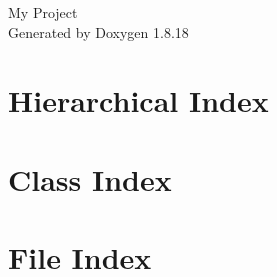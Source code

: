 \let\mypdfximage\pdfximage\def\pdfximage{\immediate\mypdfximage}\documentclass[twoside]{book}
\newcommand{\+}{\discretionary{\mbox{\scriptsize$\hookleftarrow$}}{}{}}
\newcommand{\clearemptydoublepage}{%
  \newpage{\pagestyle{empty}\cleardoublepage}%
}
\begin{document}
\hypersetup{pageanchor=false,
             bookmarksnumbered=true,
             pdfencoding=unicode
            }
\begin{titlepage}
\vspace*{7cm}
\begin{center}%
{\Large My Project }\\
\vspace*{1cm}
{\large Generated by Doxygen 1.8.18}\\
\end{center}
\end{titlepage}
\clearemptydoublepage
{}
\tableofcontents
\clearemptydoublepage
{}
\hypersetup{pageanchor=true}

\chapter{Hierarchical Index}

\chapter{Class Index}

\chapter{File Index}

\end{document}
